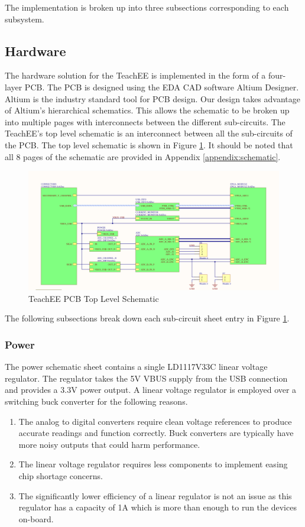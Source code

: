 \documentclass[letterpaper,11pt]{article}
\begin{document}
The implementation is broken up into three subsections corresponding to each
subsystem.

\subsection{Hardware} %
The hardware solution for the TeachEE is implemented in the form of a four-layer
PCB. The PCB is designed using the EDA CAD software Altium Designer. Altium is
the industry standard tool for PCB design. Our design takes advantage of
Altium's hierarchical schematics. This allows the schematic to be broken up into
multiple pages with interconnects between the different sub-circuits. The
TeachEE's top level schematic is an interconnect between all the sub-circuits of
the PCB. The top level schematic is shown in Figure
\ref{fig:hw-top-level-sheet}. It should be noted that all 8 pages of the
schematic are provided in Appendix \ref{appendix:schematic}.

\begin{figure}[h]
  \centering
  \includegraphics[width=\textwidth]{figures/altium-top-level.png}
  \caption{TeachEE PCB Top Level Schematic}
  \label{fig:hw-top-level-sheet}
\end{figure}

The following subsections break down each sub-circuit sheet entry in Figure
\ref{fig:hw-top-level-sheet}.

\subsubsection{Power}
The power schematic sheet contains a single LD1117V33C linear voltage regulator.
The regulator takes the 5V VBUS supply from the USB connection and provides a
3.3V power output. A linear voltage regulator is employed over a switching buck
converter for the following reasons.
  \begin{enumerate}
    \item The analog to digital converters require clean voltage references to
      produce accurate readings and function correctly. Buck converters are
      typically have more noisy outputs that could harm performance.
    \item The linear voltage regulator requires less components to implement
      easing chip shortage concerns.
    \item The significantly lower efficiency of a linear regulator is not an
      issue as this regulator has a capacity of 1A which is more than enough to
      run the devices on-board.
  \end{enumerate}
\end{document}
